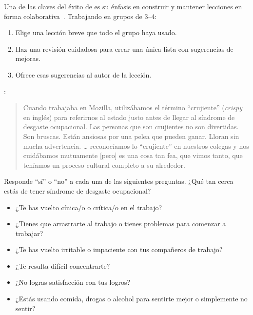 
Una de las claves del éxito de 
es su énfasis en construir y mantener lecciones en forma colaborativa~\cite{Wils2016,Deve2018}.
Trabajando en grupos de 3--4:

\begin{enumerate}

\item
  Elige una lección breve que todo el grupo haya usado.

\item
  Haz una revisión cuidadosa para crear una única lista con sugerencias de mejoras.

\item
  Ofrece esas sugerencias al autor de la lección.

\end{enumerate}


:

\begin{quote}
  Cuando trabajaba en Mozilla,
  utilizábamos el término ``crujiente'' (\emph{crispy} en inglés) para referirnos al estado justo antes de llegar al síndrome de desgaste ocupacional.
  Las personas que son crujientes no son divertidas.
  Son bruscas.
  Están ansiosas por una pelea que pueden ganar.
  Lloran sin mucha advertencia.
  {\ldots} reconocíamos lo ``crujiente'' en  nuestros colegas y nos cuidábamos  mutuamente
  [pero] es una cosa tan fea, que vimos tanto, que teníamos un proceso cultural completo a su alrededor.
\end{quote}

\noindent
Responde ``sí'' o ``no'' a cada una de las siguientes preguntas.
¿Qué tan cerca estás de tener síndrome de desgaste ocupacional?

\begin{itemize}
\item ¿Te has vuelto cínica/o o crítica/o en el trabajo?
\item ¿Tienes que arrastrarte al trabajo o tienes problemas para comenzar a trabajar?
\item ¿Te has vuelto irritable o impaciente con tus compañeros de trabajo?
\item ¿Te resulta difícil concentrarte?
\item ¿No logras satisfacción con tus logros?
\item ¿Estás usando comida, drogas o alcohol para sentirte mejor o simplemente no sentir?
\end{itemize}
